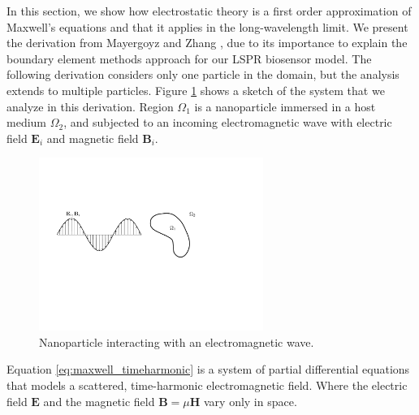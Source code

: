 In this section, we show how electrostatic theory is a first order approximation of Maxwell's 
equations and that it applies in the long-wavelength limit. We present the derivation from 
Mayergoyz and Zhang \cite{MayergoyzZhang2007}, due to its importance to explain the boundary 
element methods approach for our LSPR biosensor model. The following derivation considers only one particle 
in the domain, but the analysis extends to multiple particles. Figure \ref{fig:part_wave} shows a 
sketch of the system that we analyze in this derivation. Region $\Omega_1$ is a nanoparticle 
immersed in a host medium $\Omega_2$, and subjected to an incoming electromagnetic wave with  electric field 
$\mathbf{E}_i$ and magnetic field $\mathbf{B}_i$.

\begin{figure}%
   \centering
   \includegraphics[width=0.65\textwidth]{particle_wave.pdf} 
   \caption{Nanoparticle interacting with an electromagnetic wave.}
   \label{fig:part_wave}
\end{figure}


Equation \eqref{eq:maxwell_timeharmonic} is a system of partial differential equations that
models a scattered, time-harmonic electromagnetic field. Where the electric field $\mathbf{E}$ and 
the magnetic field $\mathbf{B} = \mu \mathbf{H}$ vary only in space. 

